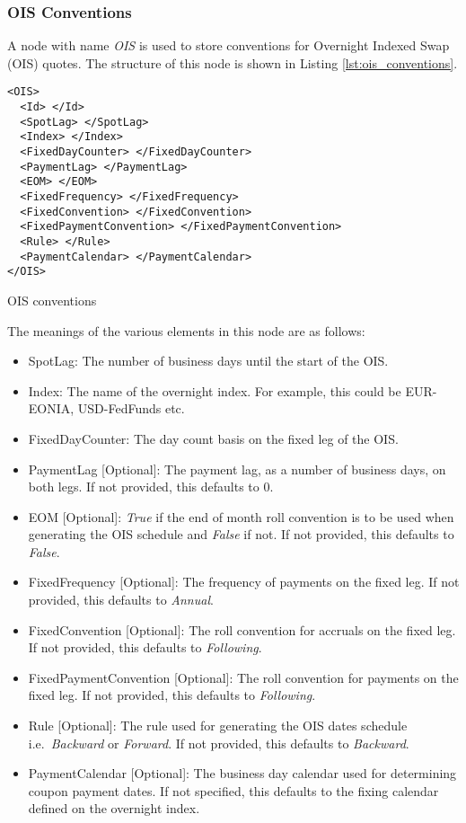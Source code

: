 \subsubsection{OIS Conventions}

A node with name \emph{OIS} is used to store conventions for Overnight Indexed Swap (OIS) quotes. The structure of this
node is shown in Listing \ref{lst:ois_conventions}.

\begin{listing}[H]
\begin{verbatim}
<OIS>
  <Id> </Id>
  <SpotLag> </SpotLag>
  <Index> </Index>
  <FixedDayCounter> </FixedDayCounter>
  <PaymentLag> </PaymentLag>
  <EOM> </EOM>
  <FixedFrequency> </FixedFrequency>
  <FixedConvention> </FixedConvention>
  <FixedPaymentConvention> </FixedPaymentConvention>
  <Rule> </Rule>
  <PaymentCalendar> </PaymentCalendar>
</OIS>
\end{verbatim}
\caption{OIS conventions}
\label{lst:ois_conventions}
\end{listing}

The meanings of the various elements in this node are as follows:
\begin{itemize}
\item SpotLag: The number of business days until the start of the OIS.
\item Index: The name of the overnight index. For example, this could be EUR-EONIA, USD-FedFunds etc.
\item FixedDayCounter: The day count basis on the fixed leg of the OIS.
\item PaymentLag [Optional]: The payment lag, as a number of business days, on both legs. If not provided, this defaults
to 0.
\item EOM [Optional]: \emph{True} if the end of month roll convention is to be used when generating the OIS schedule and
\emph{False} if not. If not provided, this defaults to \emph{False}.
\item FixedFrequency [Optional]: The frequency of payments on the fixed leg. If not provided, this defaults to
\emph{Annual}.
\item FixedConvention [Optional]: The roll convention for accruals on the fixed leg. If not provided, this defaults to
\emph{Following}.
\item FixedPaymentConvention [Optional]: The roll convention for payments on the fixed leg. If not provided, this
defaults to \emph{Following}.
\item Rule [Optional]: The rule used for generating the OIS dates schedule i.e.\ \emph{Backward} or \emph{Forward}. If
not provided, this defaults to \emph{Backward}.
\item PaymentCalendar [Optional]: The business day calendar used for determining coupon payment dates.
If not specified, this defaults to the fixing calendar defined on the overnight index.
\end{itemize}

